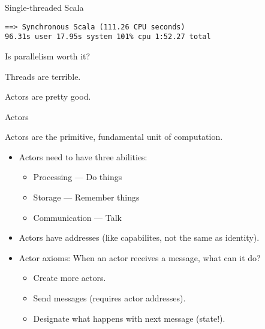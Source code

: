 \documentclass[aspectratio=169,14pt]{beamer}
\newcommand{\megatext}[1]{
  \begin{center}
    \Huge
    #1
  \end{center}
}
\begin{document}
\begin{frame}[fragile]{Single-threaded Scala}
  \begin{verbatim}
==> Synchronous Scala (111.26 CPU seconds)
96.31s user 17.95s system 101% cpu 1:52.27 total
  \end{verbatim}
\end{frame}


\begin{frame}
  \megatext{Is parallelism worth it?}
\end{frame}

\begin{frame}
  \megatext{Threads are terrible.}
\end{frame}


\begin{frame}
  \megatext{Actors are pretty good.}
\end{frame}


\begin{frame}{Actors}

  Actors are the primitive, fundamental unit of computation.

  \begin{itemize}
  \item Actors need to have three abilities:
    \begin{itemize}
    \item Processing --- Do things
    \item Storage --- Remember things
    \item Communication --- Talk
    \end{itemize}

  \item Actors have addresses (like capabilites, not the same as identity).

  \item Actor axioms: When an actor receives a message, what can it do?
    \begin{itemize}
    \item Create more actors.
    \item Send messages (requires actor addresses).
    \item Designate what happens with next message (state!).
    \end{itemize}
  \end{itemize}
\end{frame}
\end{document}
